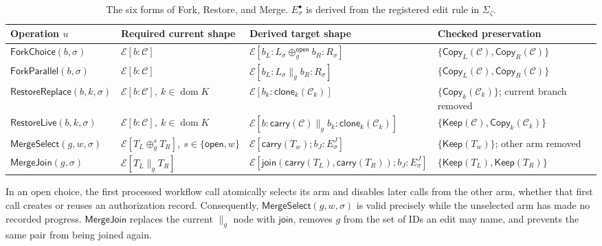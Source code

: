 \begin{table}[t]
\centering
\caption{The six forms of Fork, Restore, and Merge.
\(E_\sigma^\bullet\) is derived from the registered edit rule in \(\Sigma_\zeta\).}
\label{tab:history-rules}
\scriptsize
\setlength{\tabcolsep}{4pt}
\begin{tabular}{@{}p{}p{}
                    p{}p{}@{}}
\toprule
Operation \(u\) & Required current shape & Derived target shape &
Checked preservation\\
\midrule
\(\mathsf{ForkChoice}(b,\sigma)\) &
\(\mathcal E[b{:}\mathcal C]\) &
\(\mathcal E[b_L{:}L_\sigma\oplus_g^{\mathsf{open}}
 b_R{:}R_\sigma]\) &
\(\{\mathsf{Copy}_L(\mathcal C),\mathsf{Copy}_R(\mathcal C)\}\)\\
\(\mathsf{ForkParallel}(b,\sigma)\) &
\(\mathcal E[b{:}\mathcal C]\) &
\(\mathcal E[b_L{:}L_\sigma\parallel_g b_R{:}R_\sigma]\) &
\(\{\mathsf{Copy}_L(\mathcal C),\mathsf{Copy}_R(\mathcal C)\}\)\\
\(\mathsf{RestoreReplace}(b,k,\sigma)\) &
\(\mathcal E[b{:}\mathcal C],\ k\in\operatorname{dom}K\) &
\(\mathcal E[b_k{:}\mathsf{clone}_k(\mathcal C_k)]\) &
\(\{\mathsf{Copy}_k(\mathcal C_k)\}\);
current branch removed\\
\(\mathsf{RestoreLive}(b,k,\sigma)\) &
\(\mathcal E[b{:}\mathcal C],\ k\in\operatorname{dom}K\) &
\(\mathcal E[b{:}\mathsf{carry}(\mathcal C)
 \parallel_g b_k{:}\mathsf{clone}_k(\mathcal C_k)]\) &
\(\{\mathsf{Keep}(\mathcal C),\mathsf{Copy}_k(\mathcal C_k)\}\)\\
\(\mathsf{MergeSelect}(g,w,\sigma)\) &
\(\mathcal E[T_L\oplus_g^sT_R],\
 s\in\{\mathsf{open},w\}\) &
\(\mathcal E[\mathsf{carry}(T_w);b_J{:}E_\sigma^J]\) &
\(\{\mathsf{Keep}(T_w)\}\);
other arm removed\\
\(\mathsf{MergeJoin}(g,\sigma)\) &
\(\mathcal E[T_L\parallel_gT_R]\) &
\(\mathcal E[\mathsf{join}(\mathsf{carry}(T_L),
 \mathsf{carry}(T_R));b_J{:}E_\sigma^J]\) &
\(\{\mathsf{Keep}(T_L),\mathsf{Keep}(T_R)\}\)\\
\bottomrule
\end{tabular}
\end{table}

In an open choice, the first processed workflow call atomically selects its arm and disables later calls from the other arm, whether that first call creates or reuses an authorization record.
Consequently, \(\mathsf{MergeSelect}(g,w,\sigma)\) is valid precisely while the unselected arm has made no recorded progress.
\(\mathsf{MergeJoin}\) replaces the current \(\parallel_g\) node with \(\mathsf{join}\), removes \(g\) from the set of IDs an edit may name, and prevents the same pair from being joined again.

